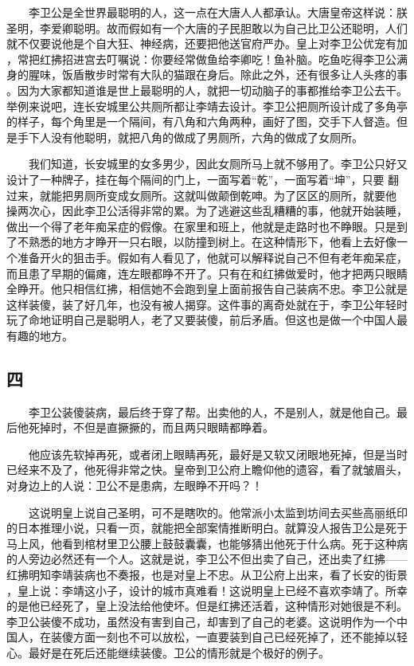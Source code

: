 　　李卫公是全世界最聪明的人，这一点在大唐人人都承认。大唐皇帝这样说：朕 圣明，李爱卿聪明。故而假如有一个大唐的子民胆敢以为自己比卫公还聪明，人们 就不仅要说他是个自大狂、神经病，还要把他送官府严办。皇上对李卫公优宠有加 ，常把红拂招进宫去叮嘱说：你要经常做鱼给李卿吃！鱼补脑。吃鱼吃得李卫公满 身的腥味，饭盾散步时常有大队的猫跟在身后。除此之外，还有很多让人头疼的事 。因为大家都知道谁是世上最聪明的人，就把一切动脑子的事都推给李卫公去干。 举例来说吧，连长安城里公共厕所都让李靖去设计。李卫公把厕所设计成了多角亭 的样子，每个角里是一个隔间，有八角和六角两种，画好了图，交手下人督造。但 是手下人没有他聪明，就把八角的做成了男厕所，六角的做成了女厕所。

 　　我们知道，长安城里的女多男少，因此女厕所马上就不够用了。李卫公只好又 设计了一种牌子，挂在每个隔间的门上，一面写着“乾”，一面写着“坤”，只要 翻过来，就能把男厕所变成女厕所。这就叫做颠倒乾呻。为了区区的厕所，就要他 操两次心，因此李卫公活得非常的累。为了逃避这些乱糟糟的事，他就开始装睡， 做出一个得了老年痴呆症的假像。在家里和班上，他就是走路时也不睁眼。只是到 了不熟悉的地方才睁开一只右眼，以防撞到树上。在这种情形下，他看上去好像一 个准备开火的狙击手。假如有人看见了，他就可以解释说自己不但有老年痴呆症， 而且患了早期的偏瘫，连左眼都睁不开了。只有在和红拂做爱时，他才把两只眼睛 全睁开。他只相信红拂，相信她不会跑到皇上面前报告自己装病不忠。李卫公就是 这样装傻，装了好几年，也没有被人揭穿。这件事的离奇处就在于，李卫公年轻时 玩了命地证明自己是聪明人，老了又要装傻，前后矛盾。但这也是做一个中国人最 有趣的地方。 
 
 
\subsection{四} 
 
 　　李卫公装傻装病，最后终于穿了帮。出卖他的人，不是别人，就是他自己。最 后他死掉时，不但是直撅撅的，而且两只眼睛都睁着。 

　　他应该先软掉再死，或者闭上眼睛再死，最好是又软又闭眼地死掉，但是当时 已经来不及了，他死得非常之快。皇帝到卫公府上瞻仰他的遗容，看了就皱眉头， 对身边上的人说：卫公不是患病，左眼睁不开吗？！

 　　这说明皇上说自己圣明，可不是瞎吹的。他常派小太监到坊间去买些高丽纸印 的日本推理小说，只看一页，就能把全部案情推断明白。就算没人报告卫公是死于 马上风，他看到棺材里卫公腰上鼓鼓囊囊，也能够猜出他死于什么病。死于这种病 的人旁边必然还有一个人。这就是说，李卫公不但出卖了自己，还出卖了红拂—— 红拂明知李靖装病也不奏报，也是对皇上不忠。从卫公府上出来，看了长安的街景 ，皇上说：李靖这小子，设计的城市真难看！这说明皇上已经不喜欢李靖了。所幸 的是他已经死了，皇上没法给他使坏。但是红拂还活着，这种情形对她很是不利。 李卫公装傻不成功，虽然没有害到自己，却害到了自己的老婆。这说明作为一个中 国人，在装傻方面一刻也不可以放松，一直要装到自己已经死掉了，还不能掉以轻 心。最好是在死后还能继续装傻。卫公的情形就是个极好的例子。

